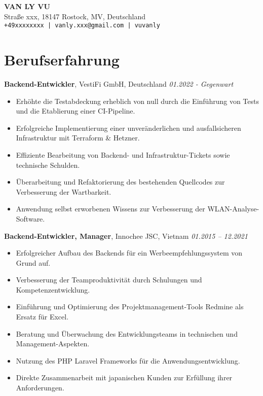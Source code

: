 \documentclass[a4paper,10pt]{article}
\begin{document}
    \begin{center}
    {\LARGE \textbf{VAN LY VU}}\\
    Straße xxx, 18147 Rostock, MV, Deutschland\\
    \texttt{+49xxxxxxxx | vanly.xxx@gmail.com | vuvanly}
    \end{center}

    \section*{Berufserfahrung}

    \textbf{Backend-Entwickler}, VestiFi GmbH, Deutschland \hfill \textit{01.2022 - Gegenwart}\\
    \begin{itemize}
        \item Erhöhte die Testabdeckung erheblich von null durch die Einführung von Tests und die Etablierung einer CI-Pipeline.
        \item Erfolgreiche Implementierung einer unveränderlichen und ausfallsicheren Infrastruktur mit Terraform \& Hetzner.
        \item Effiziente Bearbeitung von Backend- und Infrastruktur-Tickets sowie technische Schulden.
        \item Überarbeitung und Refaktorierung des bestehenden Quellcodes zur Verbesserung der Wartbarkeit.
        \item Anwendung selbst erworbenen Wissens zur Verbesserung der WLAN-Analyse-Software.
    \end{itemize}

    \textbf{Backend-Entwickler, Manager}, Innochee JSC, Vietnam \hfill \textit{01.2015 – 12.2021}\\
    \begin{itemize}
        \item Erfolgreicher Aufbau des Backends für ein Werbeempfehlungssystem von Grund auf.
        \item Verbesserung der Teamproduktivität durch Schulungen und Kompetenzentwicklung.
        \item Einführung und Optimierung des Projektmanagement-Tools Redmine als Ersatz für Excel.
        \item Beratung und Überwachung des Entwicklungsteams in technischen und Management-Aspekten.
        \item Nutzung des PHP Laravel Frameworks für die Anwendungsentwicklung.
        \item Direkte Zusammenarbeit mit japanischen Kunden zur Erfüllung ihrer Anforderungen.
    \end{itemize}
\end{document}
